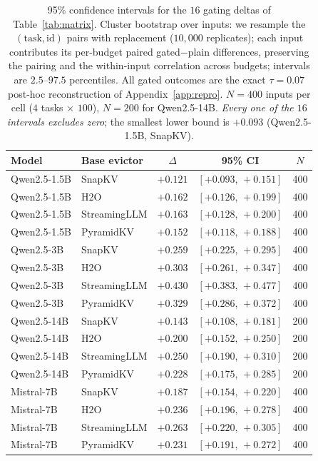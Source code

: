 \begin{table}[t]
\centering
\caption{95\% confidence intervals for the $16$ gating deltas of
Table~\ref{tab:matrix}. Cluster bootstrap over inputs: we resample the
$(\text{task}, \text{id})$ pairs with replacement ($10{,}000$ replicates);
each input contributes its per-budget paired gated$-$plain differences,
preserving the pairing and the within-input correlation across budgets;
intervals are $2.5$--$97.5$ percentiles. All gated outcomes are the exact
$\tau = 0.07$ post-hoc reconstruction of Appendix~\ref{app:repro}.
$N = 400$ inputs per cell ($4$ tasks $\times$ $100$), $N = 200$ for
Qwen2.5-14B. \emph{Every one of the $16$ intervals excludes zero}; the
smallest lower bound is $+0.093$ (Qwen2.5-1.5B, SnapKV).}
\label{tab:matrix-ci}
\begin{tabular}{llccc}
\toprule
Model & Base evictor & $\Delta$ & 95\% CI & $N$ \\
\midrule
Qwen2.5-1.5B & SnapKV       & $+0.121$ & $[+0.093,\,+0.151]$ & 400 \\
Qwen2.5-1.5B & H2O          & $+0.162$ & $[+0.126,\,+0.199]$ & 400 \\
Qwen2.5-1.5B & StreamingLLM & $+0.163$ & $[+0.128,\,+0.200]$ & 400 \\
Qwen2.5-1.5B & PyramidKV    & $+0.152$ & $[+0.118,\,+0.188]$ & 400 \\
\midrule
Qwen2.5-3B   & SnapKV       & $+0.259$ & $[+0.225,\,+0.295]$ & 400 \\
Qwen2.5-3B   & H2O          & $+0.303$ & $[+0.261,\,+0.347]$ & 400 \\
Qwen2.5-3B   & StreamingLLM & $+0.430$ & $[+0.383,\,+0.477]$ & 400 \\
Qwen2.5-3B   & PyramidKV    & $+0.329$ & $[+0.286,\,+0.372]$ & 400 \\
\midrule
Qwen2.5-14B  & SnapKV       & $+0.143$ & $[+0.108,\,+0.181]$ & 200 \\
Qwen2.5-14B  & H2O          & $+0.200$ & $[+0.152,\,+0.250]$ & 200 \\
Qwen2.5-14B  & StreamingLLM & $+0.250$ & $[+0.190,\,+0.310]$ & 200 \\
Qwen2.5-14B  & PyramidKV    & $+0.228$ & $[+0.175,\,+0.285]$ & 200 \\
\midrule
Mistral-7B   & SnapKV       & $+0.187$ & $[+0.154,\,+0.220]$ & 400 \\
Mistral-7B   & H2O          & $+0.236$ & $[+0.196,\,+0.278]$ & 400 \\
Mistral-7B   & StreamingLLM & $+0.263$ & $[+0.220,\,+0.305]$ & 400 \\
Mistral-7B   & PyramidKV    & $+0.231$ & $[+0.191,\,+0.272]$ & 400 \\
\bottomrule
\end{tabular}
\end{table}


